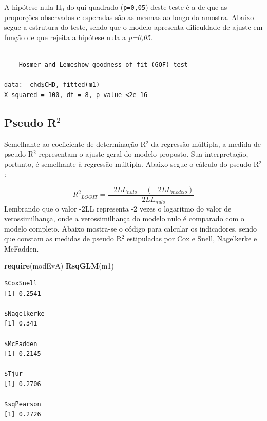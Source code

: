 \documentclass[12pt,brazil,oneside]{book}
\newenvironment{Shaded}{\begin{snugshade}}{\end{snugshade}}
\newcommand{\DataTypeTok}[1]{\textcolor[rgb]{0.13,0.29,0.53}{#1}}
\newcommand{\DecValTok}[1]{\textcolor[rgb]{0.00,0.00,0.81}{#1}}
\newcommand{\KeywordTok}[1]{\textcolor[rgb]{0.13,0.29,0.53}{\textbf{#1}}}
\newcommand{\NormalTok}[1]{#1}
\newcommand{\OperatorTok}[1]{\textcolor[rgb]{0.81,0.36,0.00}{\textbf{#1}}}
\begin{document}
A hipótese nula H\({_0}\) do qui-quadrado (\texttt{p=0,05}) deste teste
é a de que as proporções observadas e esperadas são as mesmas ao longo
da amostra. Abaixo segue a estrutura do teste, sendo que o modelo
apresenta dificuldade de ajuste em função de que rejeita a hipótese nula
a \emph{p=0,05}.

\begin{Shaded}
\end{Shaded}

\begin{verbatim}

    Hosmer and Lemeshow goodness of fit (GOF) test

data:  chd$CHD, fitted(m1)
X-squared = 100, df = 8, p-value <2e-16
\end{verbatim}

\hypertarget{pseudo-r2}{%
\subsection{\texorpdfstring{Pseudo
R\(^2\)}{Pseudo R\^{}2}}\label{pseudo-r2}}

Semelhante ao coeficiente de determinação R\({^2}\) da regressão
múltipla, a medida de pseudo R\({^2}\) representam o ajuste geral do
modelo proposto. Sua interpretação, portanto, é semelhante à regressão
múltipla. Abaixo segue o cálculo do pseudo R\({^2}\):

\[
R{^2}_{LOGIT} = \frac{-2LL_{nulo}-(-2LL_{modelo})}{-2LL_{nulo}}
\] Lembrando que o valor -2LL representa -2 vezes o logaritmo do valor
de verossimilhança, onde a verossimilhança do modelo nulo é comparado
com o modelo completo. Abaixo mostra-se o código para calcular os
indicadores, sendo que constam as medidas de pseudo R\({^2}\)
estipuladas por Cox e Snell, Nagelkerke e McFadden.

\begin{Shaded}
\begin{Highlighting}[]
\KeywordTok{require}\NormalTok{(modEvA)}
\KeywordTok{RsqGLM}\NormalTok{(m1)}
\end{Highlighting}
\end{Shaded}

\begin{verbatim}
$CoxSnell
[1] 0.2541

$Nagelkerke
[1] 0.341

$McFadden
[1] 0.2145

$Tjur
[1] 0.2706

$sqPearson
[1] 0.2726
\end{verbatim}
\end{document}
